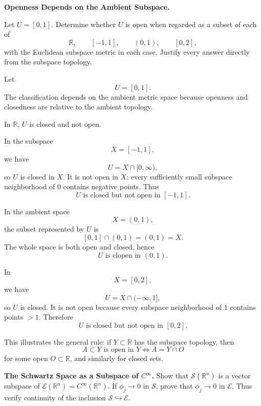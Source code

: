 \begin{problem}[CP-II-0554]
\label{prob:cp-ii-0554}
\textbf{Openness Depends on the Ambient Subspace.}

\hspace*{1.5em}Let \(U=[0,1]\). Determine whether \(U\) is open when regarded as a subset of
each of
\[
\mathbb R,\qquad [-1,1],\qquad (0,1),\qquad [0,2],
\]
with the Euclidean subspace metric in each case. Justify every answer directly
from the subspace topology.
\end{problem}

\begin{solution}
Let
\[
U=[0,1].
\]
The classification depends on the ambient metric space because openness and closedness are
relative to the ambient topology.

In \(\mathbb R\), \(U\) is closed and not open.

In the subspace
\[
X=[-1,1],
\]
we have
\[
U=X\cap[0,\infty),
\]
so \(U\) is closed in \(X\). It is not open in \(X\): every sufficiently small subspace
neighborhood of \(0\) contains negative points. Thus
\[
\boxed{U\text{ is closed but not open in }[-1,1].}
\]

In the ambient space
\[
X=(0,1),
\]
the subset represented by \(U\) is
\[
[0,1]\cap(0,1)=(0,1)=X.
\]
The whole space is both open and closed, hence
\[
\boxed{U\text{ is clopen in }(0,1).}
\]

In
\[
X=[0,2],
\]
we have
\[
U=X\cap(-\infty,1],
\]
so \(U\) is closed. It is not open because every subspace neighborhood of \(1\) contains
points \(>1\). Therefore
\[
\boxed{U\text{ is closed but not open in }[0,2].}
\]

This illustrates the general rule: if \(Y\subset\mathbb R\) has the subspace topology, then
\[
A\subset Y\text{ is open in }Y
\iff
A=Y\cap O
\]
for some open \(O\subset\mathbb R\), and similarly for closed sets.
\end{solution}


\begin{problem}[CP-II-0564]
\label{prob:cp-ii-0564}
\textbf{The Schwartz Space as a Subspace of \(C^\infty\).}
Show that \(\mathcal S(\mathbb R^n)\) is a vector subspace of
\(\mathcal E(\mathbb R^n)=C^\infty(\mathbb R^n)\). If \(\phi_j\to0\) in
\(\mathcal S\), prove that \(\phi_j\to0\) in \(\mathcal E\). Thus verify
continuity of the inclusion \(\mathcal S\hookrightarrow\mathcal E\).
\end{problem}

